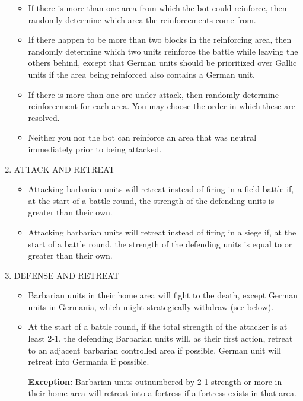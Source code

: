 \begin{enumerate}
\begin{itemize}
    \item If there is more than one area from which the bot could reinforce, then randomly determine which area the reinforcements come from.
    
    \item If there happen to be more than two blocks in the reinforcing area, then randomly determine which two units reinforce the battle while leaving the others behind, except that German units should be prioritized over Gallic units if the area being reinforced also contains a German unit.
    
    \item If there is more than one are under attack, then randomly determine reinforcement for each area. You may choose the order in which these are resolved.
    
    \item Neither you nor the bot can reinforce an area that was neutral immediately prior to being attacked.
  \end{itemize}
  
  \item ATTACK AND RETREAT
  \begin{itemize}
    \item Attacking barbarian units will retreat instead of firing in a field battle if, at the start of a battle round, the strength of the defending units is greater than their own.
    \item Attacking barbarian units will retreat instead of firing in a siege if, at the start of a battle round, the strength of the defending units is equal to or greater than their own.
  \end{itemize}
  
  \item DEFENSE AND RETREAT
  \begin{itemize}
    \item Barbarian units in their home area will fight to the death, except German units in Germania, which might strategically withdraw (see below).
    \item At the start of a battle round, if the total strength of the attacker is at least 2-1, the defending Barbarian units will, as their first action, retreat to an adjacent barbarian controlled area if possible. German unit will retreat into Germania if possible.
    
    \textbf{Exception:} Barbarian units outnumbered by 2-1 strength or more in their home area will retreat into a fortress if a fortress exists in that area.
    

\end{itemize}
\end{enumerate}

